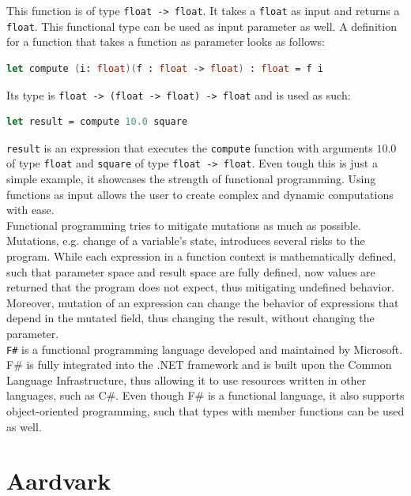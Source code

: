 This function is of type \verb|float -> float|. It takes a \verb|float| as input and returns a \verb|float|. This functional type can be used as input parameter as well. A definition for a function that takes a function as parameter looks as follows: 

\begin{lstlisting}[language=FSharp]
let compute (i: float)(f : float -> float) : float = f i
\end{lstlisting}
Its type is \verb|float -> (float -> float) -> float| and is used as such: 
\begin{lstlisting}[language=FSharp]
let result = compute 10.0 square
\end{lstlisting}

\verb|result| is an expression that executes the \verb|compute| function with arguments $10.0$ of type \verb|float| and \verb|square| of type \verb|float -> float|. Even tough this is just a simple example, it showcases the strength of functional programming.  Using functions as input allows the user to create complex and dynamic computations with ease. 
\\

Functional programming tries to mitigate mutations as much as possible. Mutations, e.g. change of a variable's state, introduces several risks to the program. While each expression in a function context is mathematically defined, such that parameter space and result space are fully defined, now values are returned that the program does not expect, thus mitigating undefined behavior. Moreover, mutation of an expression can change the behavior of expressions that depend in the mutated field, thus changing the result, without changing the parameter. 
\\

\verb|F#|\cite{FSharp} is a functional programming language developed and maintained by Microsoft\cite{Microsoft}. F\# is fully integrated into the .NET framework\cite{DotNet} and is built upon the Common Language Infrastructure\cite{CLI}, thus allowing it to use resources written in other languages, such as C\#\cite{CSharp}. Even though F\# is a functional language, it also supports object-oriented programming, such that types with member functions can be used as well. 


\section{Aardvark}
\label{sec:aardvark}

